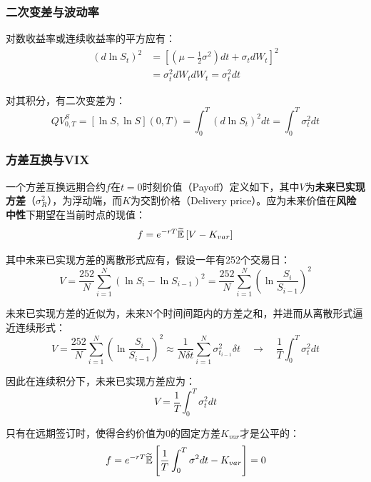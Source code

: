 \documentclass[11pt]{article}
\begin{document}
\subsubsection*{二次变差与波动率}

对数收益率或连续收益率的平方应有：
\begin{align*}
    ( d\ln S_t )^2 &= \left[ \left(\mu - \frac{1}{2} \sigma^2 \right)dt + \sigma_t dW_t\right]^2 \\
    & = \sigma_t^2 dW_t dW_t = \sigma_t^2 dt
\end{align*}

对其积分，有二次变差为：
\begin{equation*}
        QV_{0,T}^{S} = \left[\ln S, \ln S \right](0,T) = \int_{0}^{T} (d\ln S_t)^2 dt = \int_{0}^{T} \sigma_t^2 dt
\end{equation*}

\subsubsection{方差互换与VIX}

一个方差互换远期合约$f$在$t=0$时刻价值（Payoff）定义如下，其中$V$为\textbf{未来已实现方差}（$\sigma_R^2$），为浮动端，而$K$为交割价格（Delivery price）。应为未来价值在\textbf{风险中性}下期望在当前时点的现值：
\begin{equation*}
    f = e^{-rT} \widetilde{\mathbb{E}} \left[V - K_{var} \right]
\end{equation*}

其中未来已实现方差的离散形式应有，假设一年有252个交易日：
\begin{equation*}
    V = \frac{252}{N} \sum^{N}_{i=1}\left(\ln S_i - \ln S_{i-1} \right)^2
    = \frac{252}{N} \sum^{N}_{i=1}\left(\ln \frac{S_i}{S_{i-1}} \right)^2
\end{equation*}

未来已实现方差的近似为，未来N个时间间距内的方差之和，并进而从离散形式逼近连续形式：
\begin{equation*}
    V = \frac{252}{N} \sum^{N}_{i=1}\left(\ln \frac{S_i}{S_{i-1}} \right)^2
    \approx \frac{1}{N\delta t} \sum^{N}_{i=1} \sigma^{2}_{t_{i-1}}\delta t
    \quad\rightarrow\quad \frac{1}{T} \int^T_0 \sigma^2_t dt
\end{equation*}

因此在连续积分下，未来已实现方差应为：
\begin{equation*}
    V = \frac{1}{T} \int^T_0 \sigma^2_t dt
\end{equation*}

只有在远期签订时，使得合约价值为0的固定方差$K_{var}$才是公平的：
\begin{equation*}
    f = e^{-rT} \widetilde{\mathbb{E}} \left[ \frac{1}{T} \int^T_0 \sigma^2 dt - K_{var} \right] = 0
\end{equation*}
\end{document}
